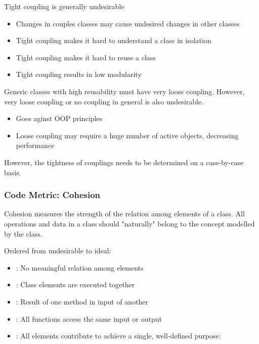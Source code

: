 \documentclass[
../../Software_Engineering_Summary.tex,
]
{subfiles}
\begin{document}
\begin{defbox}
    Tight coupling is generally undesirable
    \begin{itemize}
        \item Changes in couples classes may cause undesired changes in other classes
        \item Tight coupling makes it hard to understand a class in isolation
        \item Tight coupling makes it hard to reuse a class
        \item Tight coupling results in low modularity
    \end{itemize}

    Generic classes with high reusability must have very loose coupling. However, very loose coupling or no coupling in general is also undesirable.

    \begin{itemize}
        \item Goes aginst OOP principles
        \item Loose coupling may require a huge number of active objects, decreasing performance
    \end{itemize}

    However, the tightness of couplings needs to be determined on a case-by-case basis.
\end{defbox}

\subsubsection{Code Metric: Cohesion}
Cohesion measures the strength of the relation among elements of a class. All operations and data in a class should "naturally" belong to the concept modelled by the class. 

\begin{defbox}
    Ordered from undesirable to ideal:
    \begin{itemize}
        \item {}: No meaningful relation among elements
        \item {}: Class elements are executed together
        \item {}: Result of one method in input of another
        \item {}: All functions access the same input or output
        \item {}: All elements contribute to achieve a single, well-defined purpose:  
    \end{itemize}
\end{defbox}
\end{document}
